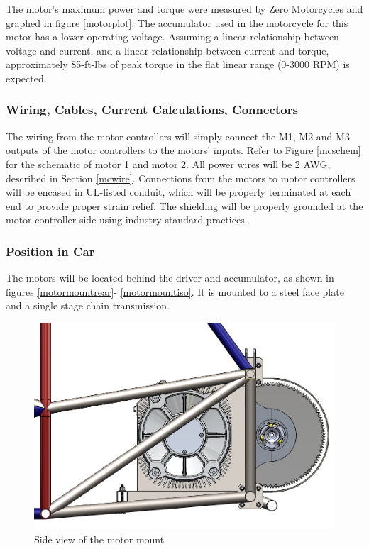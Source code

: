\documentclass{article}
\begin{document}
            The motor's maximum power and torque were measured by Zero Motorcycles and graphed in figure \ref{motorplot}. The accumulator used in the motorcycle for this motor has a lower operating voltage. Assuming a linear relationship between voltage and current, and a linear relationship between current and torque, approximately 85-ft-lbs of peak torque in the flat linear range (0-3000 RPM) is expected.

        \subsubsection{Wiring, Cables, Current Calculations, Connectors} \label{motorswiring}


            The wiring from the motor controllers will simply connect the M1, M2 and M3 outputs of the motor controllers to the motors' inputs. Refer to Figure \ref{mcschem} for the schematic of motor 1 and motor 2. All power wires will be 2 AWG, described in Section \ref{mcwire}.
            Connections from the motors to motor controllers will be encased in UL-listed conduit, which will be properly terminated at each end to provide proper strain relief. The shielding will be properly grounded at the motor controller side using industry standard practices.

        \subsubsection{Position in Car}

            The motors will be located behind the driver and accumulator, as shown in figures \ref{motormountrear}- \ref{motormountiso}. It is mounted to a steel face plate and a single stage chain transmission.

            \begin{figure}[H]
                \centering
                \includegraphics[width = 0.6 \textwidth]{motormount_sideview}
                \caption{Side view of the motor mount}
                \label{motormountside}
            \end{figure}
\end{document}
